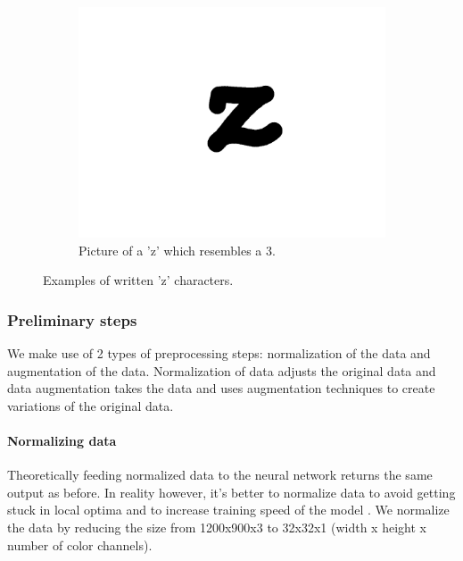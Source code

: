 \documentclass{article}
\begin{document}
\begin{figure}
\begin{subfigure}{0.15\textwidth}
  \includegraphics[width=\linewidth]{images/good_char}
  \caption{Picture of a 'z' which resembles a 3.}
\end{subfigure}
\caption{Examples of written 'z' characters.}
\label{fig:char}
\end{figure}


\subsubsection{Preliminary steps}
\label{sec:preproc}
We make use of 2 types of preprocessing steps: normalization of the data and augmentation of the data. Normalization of data adjusts the original data and data augmentation takes the data and uses augmentation techniques to create variations of the original data.

\paragraph{Normalizing data} 
\label{par:norm}
Theoretically feeding normalized data to the neural network returns the same output as before. 
In reality however, it's better to normalize data to avoid getting stuck in local optima and to increase training speed of the model \cite{NormGoal}. We normalize the data by reducing the size from 1200x900x3 to 32x32x1 (width x height x number of color channels).


\end{document}
